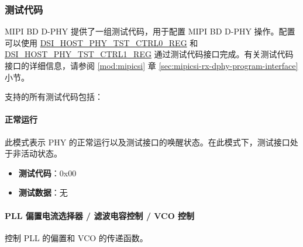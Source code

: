 \documentclass[main\_\_CN.tex]{subfiles}
\begin{document}
\subsubsection{测试代码}
MIPI BD D-PHY 提供了一组测试代码，用于配置 MIPI BD D-PHY 操作。配置可以使用 \hyperref[regdesc:DSIHOSTPHYTSTCTRL0REG]{DSI\_HOST\_PHY\_TST\_CTRL0\_REG} 和 \hyperref[regdesc:DSIHOSTPHYTSTCTRL1REG]{DSI\_HOST\_PHY\_TST\_CTRL1\_REG} 通过测试代码接口完成。有关测试代码接口的详细信息，请参阅 \ref{mod:mipicsi} \textit{} 章 \ref{sec:mipicsi-rx-dphy-program-interface} 小节。

支持的所有测试代码包括：

\paragraph{正常运行}
\label{sec:normal-operation}
此模式表示 PHY 的正常运行以及测试接口的唤醒状态。在此模式下，测试接口处于非活动状态。

\begin{itemize}
    \item \textbf{测试代码}：0x00
    \item \textbf{测试数据}：无
\end{itemize}

\paragraph{PLL 偏置电流选择器 / 滤波电容控制 / VCO 控制}
\label{sec:test-code-0x10}
控制 PLL 的偏置和 VCO 的传递函数。
\end{document}
